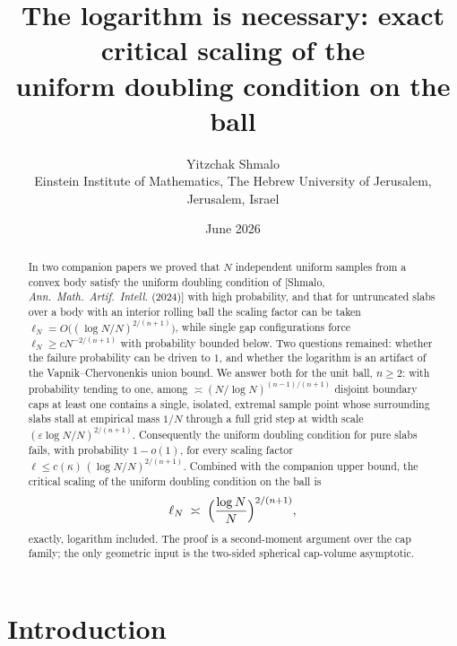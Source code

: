 \documentclass[11pt]{article}
\title{The logarithm is necessary: exact critical scaling of the\\
uniform doubling condition on the ball}
\author{Yitzchak Shmalo\\
\small Einstein Institute of Mathematics, The Hebrew University of Jerusalem, Jerusalem, Israel\\
\small }
\date{June 2026}
\begin{document}
\maketitle

\begin{abstract}
In two companion papers we proved that $N$ independent uniform samples from a
convex body satisfy the uniform doubling condition of
[Shmalo, \emph{Ann.\ Math.\ Artif.\ Intell.} (2024)] with high probability, and
that for untruncated slabs over a body with an interior rolling ball the scaling
factor can be taken $\ell_N=O\bigl((\log N/N)^{2/(n+1)}\bigr)$, while single
gap configurations force $\ell_N\ge cN^{-2/(n+1)}$ with probability bounded
below.  Two questions remained: whether the failure probability can be driven
to $1$, and whether the logarithm is an artifact of the Vapnik--Chervonenkis
union bound.  We answer both for the unit ball, $n\ge2$: with probability
tending to one, among $\asymp(N/\log N)^{(n-1)/(n+1)}$ disjoint boundary caps
at least one contains a single, isolated, extremal sample point whose
surrounding slabs stall at empirical mass $1/N$ through a full grid step at
width scale $(\varepsilon\log N/N)^{2/(n+1)}$.  Consequently the uniform
doubling condition for pure slabs fails, with probability $1-o(1)$, for every
scaling factor $\ell\le c(\kappa)\,(\log N/N)^{2/(n+1)}$.  Combined with the
companion upper bound, the critical scaling of the uniform doubling condition
on the ball is
\[
\ell_N\;\asymp\;\Bigl(\frac{\log N}{N}\Bigr)^{2/(n+1)},
\]
exactly, logarithm included.  The proof is a second-moment argument over the
cap family; the only geometric input is the two-sided spherical cap-volume
asymptotic.
\end{abstract}

\section{Introduction}\label{sec:intro}
\end{document}
